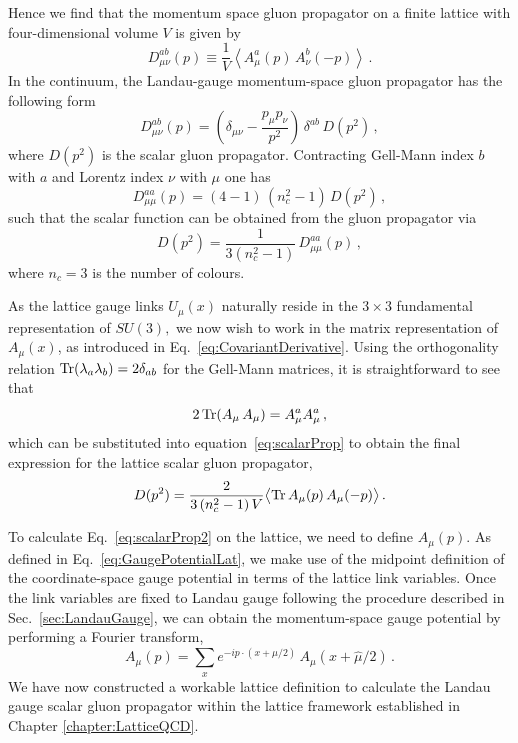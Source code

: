 Hence we find that the momentum space gluon propagator on a finite lattice with four-dimensional volume $V$ is given by
%
\begin{equation}
D_{\mu\nu}^{ab}(p) \equiv \frac{1}{V}\left \langle A^a_\mu (p)\,A^b_\nu(-p)\right\rangle \, . \label{eq:gluonProp}
\end{equation}
%
In the continuum, the Landau-gauge momentum-space gluon propagator has the following form~\cite{Leinweber:1998im,Bonnet:2001uh}
%
\begin{equation}
D^{ab}_{\mu\nu}(p) = \left ( \delta_{\mu\nu} - \frac{p_\mu p_\nu}{p^2} \right )\,\delta^{ab}\,D(p^2) \, ,
\end{equation}
%
where $D(p^2)$ is the scalar gluon propagator.  Contracting Gell-Mann index $b$ with $a$ and
Lorentz index $\nu$ with $\mu$ one has
%
\begin{equation}
D^{aa}_{\mu\mu}(p) = (4-1)\,(n_c^2-1)\,D(p^2) \, ,
\end{equation}
%
such that the scalar function can be obtained from the gluon propagator via
%
\begin{equation}
D(p^2) = \frac{1}{3(n_c^2-1)}\,D^{aa}_{\mu\mu}(p) \, ,
\label{eq:scalarProp}
\end{equation}
%
where $n_c = 3$ is the number of colours.

As the lattice gauge links $U_\mu(x)$ naturally reside in the $3\times 3$ fundamental representation of $SU(3),$ we now wish to work in the matrix representation of $A_\mu(x)$, as introduced in Eq.~\ref{eq:CovariantDerivative}. Using the orthogonality relation $\operatorname{Tr}(\lambda_a\lambda_b) = 2\delta_{ab}$ for the Gell-Mann matrices, it is straightforward to see that
%
\begin{equation}
2\operatorname{Tr}(A_\mu\,A_\mu) = A^a_\mu A^a_\mu\, ,
\end{equation}
%
which can be substituted into equation~\ref{eq:scalarProp} to obtain the final expression for the lattice scalar gluon propagator,
%
\begin{equation}
D(p^2) = \frac{2}{3\,(n_c^2-1)\,V}\big\langle {\rm Tr}\, A_\mu(p)\,A_\mu(-p) \big\rangle \,. \label{eq:scalarProp2}
\end{equation}

To calculate Eq.~\ref{eq:scalarProp2} on the lattice, we need to define $A_\mu(p)$. As defined in Eq.~\ref{eq:GaugePotentialLat}, we make use of the midpoint definition of the coordinate-space gauge potential in terms of the lattice link variables. Once the link variables are fixed to Landau gauge following the procedure described in Sec.~\ref{sec:LandauGauge}, we can obtain the momentum-space gauge potential by performing a Fourier transform,
%
\begin{equation}
A_\mu(p) = \sum_x e^{-ip\cdot(x+\hat{\mu}/2)}\, A_\mu(x+\hat{\mu}/2)\, .
\end{equation}
%
We have now constructed a workable lattice definition to calculate the Landau gauge scalar gluon propagator within the lattice framework established in Chapter \ref{chapter:LatticeQCD}.

